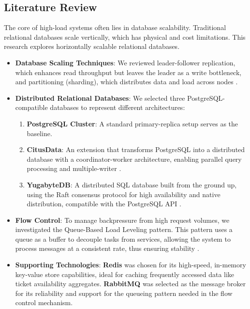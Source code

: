 \subsection{Literature Review}
The core of high-load systems often lies in database scalability. Traditional relational databases scale vertically, which has physical and cost limitations. This research explores horizontally scalable relational databases.
\begin{itemize}
    \item \textbf{Database Scaling Techniques}: We reviewed leader-follower replication, which enhances read throughput but leaves the leader as a write bottleneck, and partitioning (sharding), which distributes data and load across nodes \cite{dataIntensiveApplications}.
    \item \textbf{Distributed Relational Databases}: We selected three PostgreSQL-compatible databases to represent different architectures:
          \begin{enumerate}
              \item \textbf{PostgreSQL Cluster}: A standard primary-replica setup serves as the baseline.
              \item \textbf{CitusData}: An extension that transforms PostgreSQL into a distributed database with a coordinator-worker architecture, enabling parallel query processing and multiple-writer \cite{citus}.
              \item \textbf{YugabyteDB}: A distributed SQL database built from the ground up, using the Raft consensus protocol for high availability and native distribution, compatible with the PostgreSQL API \cite{yugabyte}.
          \end{enumerate}
    \item \textbf{Flow Control}: To manage backpressure from high request volumes, we investigated the Queue-Based Load Leveling pattern. This pattern uses a queue as a buffer to decouple tasks from services, allowing the system to process messages at a consistent rate, thus ensuring stability \cite{queueLoadLeveling}.
    \item \textbf{Supporting Technologies}: \textbf{Redis} was chosen for its high-speed, in-memory key-value store capabilities, ideal for caching frequently accessed data like ticket availability aggregates. \textbf{RabbitMQ} was selected as the message broker for its reliability and support for the queueing pattern needed in the flow control mechanism.
\end{itemize}

